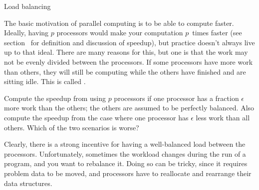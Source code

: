  {Load balancing}

The basic motivation of parallel computing is to be able to compute
faster.  Ideally, having $p$ processors would make your computation
$p$~times faster (see section~ for
definition and discussion of speedup), but practice doesn't always
live up to that ideal. There are many reasons for this, but one is
that the work may not be evenly divided between the processors.  If
some processors have more work than others, they will still be
computing while the others have finished and are sitting idle. This is
called .

\begin{exercise}
  Compute the speedup from using $p$ processors if one processor has a
  fraction $\epsilon$ more work than the others; the others are
  assumed to be perfectly balanced. Also compute the speedup from the
  case where one processor has $\epsilon$ less work than all
  others. Which of the two scenarios is worse?
\end{exercise}

Clearly, there is a strong incentive for having a well-balanced
load between the processors. Unfortunately, sometimes the workload
changes during the run of a program, and you want to rebalance it.
Doing so can be tricky, since it requires problem data to be moved,
and processors have to reallocate and rearrange their data structures.

\endinput
\begin{review}
  \Level 1 {Review questions}
  
\end{review}
